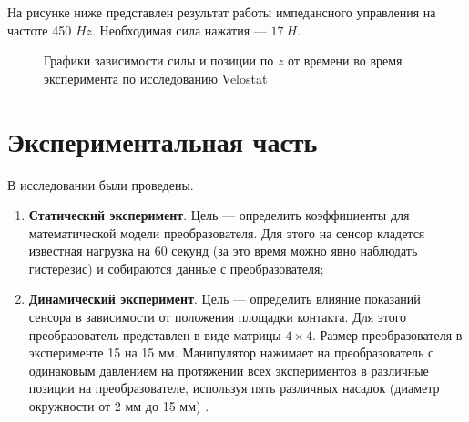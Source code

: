На рисунке ниже  представлен результат работы импедансного управления на частоте 450 $Hz$. Необходимая сила нажатия --- $17\ H$.
\begin{figure}[H]
        \centering
        \caption{Графики зависимости силы и позиции по $z$ от времени во время эксперимента по исследованию Velostat}
        \label{fig:force_data_pos.png}
    \end{figure}

\section{Экспериментальная часть}

В исследовании были проведены.
\begin{enumerate}
    \item \textbf{Статический эксперимент}. Цель — определить коэффициенты для математической модели преобразователя. Для этого на сенсор кладется известная нагрузка на 60 секунд (за это время можно явно наблюдать гистерезис) и собираются данные с преобразователя;
          \item\textbf{Динамический эксперимент}. Цель — определить влияние показаний сенсора в зависимости от положения площадки контакта. Для этого преобразователь представлен в виде матрицы $4 \times 4$. Размер преобразователя в эксперименте 15 на 15 мм. Манипулятор нажимает на преобразователь с одинаковым давлением на протяжении всех экспериментов в различные позиции на преобразователе, используя пять различных насадок (диаметр окружности от 2 мм до 15 мм) .
\end{enumerate}



